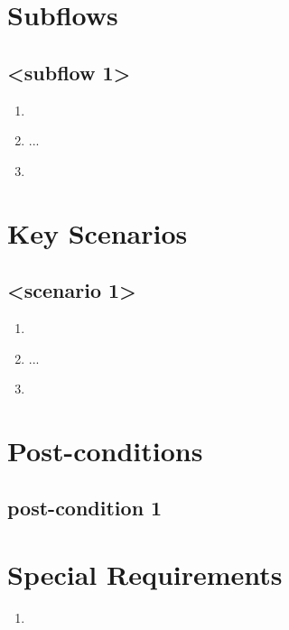 \section{Subflows}
\subsection{<subflow 1>}
\begin{enumerate}
  \item <subflow 1, step 1>
  \item ...
  \item <subflow 1, step n>
\end{enumerate}


\section{Key Scenarios}
\subsection{<scenario 1>}
\begin{enumerate}
  \item <scenario 1, step 1>
  \item ...
  \item <scenario 1, step n>
\end{enumerate}


\section{Post-conditions}
\subsection{post-condition 1}


\section{Special Requirements}
\begin{enumerate}
  \item <special requirement 1>
\end{enumerate}
